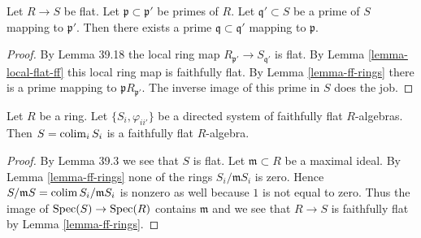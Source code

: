 \begin{lemma}\cite[\href{https://stacks.math.columbia.edu/tag/00HS}{Lemma 00HS}]{stacks-project}
	\label{lemma-flat-going-down}
	Let $R \to S$ be flat. Let $\mathfrak p \subset \mathfrak p'$
	be primes of $R$. Let $\mathfrak q' \subset S$ be a prime of $S$
	mapping to $\mathfrak p'$. Then there exists a prime
	$\mathfrak q \subset \mathfrak q'$ mapping to $\mathfrak p$.
\end{lemma}

\begin{proof}
	By Lemma 39.18 the local ring map
	$R_{\mathfrak p'} \to S_{\mathfrak q'}$ is flat.
	By Lemma \ref{lemma-local-flat-ff} this local ring map is faithfully
	flat. By Lemma \ref{lemma-ff-rings} there is a prime mapping to
	$\mathfrak p R_{\mathfrak p'}$. The inverse image of this
	prime in $S$ does the job.
\end{proof}

\begin{lemma}\cite[\href{https://stacks.math.columbia.edu/tag/090N}{Lemma 090N}]{stacks-project}
	\label{lemma-colimit-faithfully-flat}
	Let $R$ be a ring. Let $\{S_i, \varphi_{ii'}\}$ be a directed system of
	faithfully flat $R$-algebras. Then $S = \mathop{\mathrm{colim}}\nolimits_i S_i$ is a faithfully flat
	$R$-algebra.
\end{lemma}

\begin{proof}
	By Lemma 39.3 we see that $S$ is flat.
	Let $\mathfrak m \subset R$ be a maximal ideal. By
	Lemma \ref{lemma-ff-rings}
	none of the rings $S_i/\mathfrak m S_i$ is zero.
	Hence $S/\mathfrak mS = \mathop{\mathrm{colim}}\nolimits S_i/\mathfrak mS_i$ is nonzero
	as well because $1$ is not equal to zero. Thus the image of
	$\mathop{\mathrm{Spec}}(S) \to \mathop{\mathrm{Spec}}(R)$ contains $\mathfrak m$ and we see that $R \to S$
	is faithfully flat by Lemma \ref{lemma-ff-rings}.
\end{proof}


